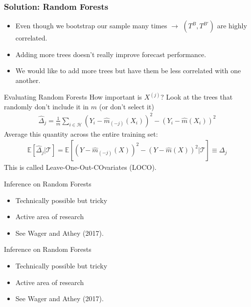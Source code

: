 \documentclass[xcolor=pdftex,dvipsnames,table,mathserif]{beamer}
\begin{document}
\begin{frame}
\frametitle{Solution: Random Forests}
\begin{itemize}
\item Even though we bootstrap our sample many times $\rightarrow$ $(T^B,T^{B'})$ are highly correlated.
\item Adding more trees doesn't really improve forecast performance.
\item We would like to add more trees but have them be \alert{less correlated} with one another.
\end{itemize}
\end{frame}

\begin{frame}{Evaluating Random Forests}
How important is $X^{(j)}$? Look at the trees that randomly don't include it in $m$ (or don't select it)
\begin{align*}
\widehat{\Delta}_{j}=\frac{1}{m} \sum_{i \in \mathcal{H}} \left(Y_{i}-\widehat{m}_{(-j)}\left(X_{i}\right)\right)^{2}-\left(Y_{i}-\widehat{m}\left(X_{i}\right)\right)^{2}
\end{align*}
Average this quantity across the entire training set:
\begin{align*}
\mathbb{E}\left[\widehat{\Delta}_{j} | \mathcal{T}\right]=\mathbb{E}\left[\left(Y-\widehat{m}_{(-j)}(X)\right)^{2}-(Y-\widehat{m}(X))^{2} | \mathcal{T}\right] \equiv \Delta_{j}
\end{align*}
This is called \alert{Leave-One-Out-COvariates} (LOCO).
\end{frame}


\begin{frame}{Inference on Random Forests}
\begin{itemize}
\item Technically possible but tricky
\item Active area of research
\item See Wager and Athey (2017).
\end{itemize}
\end{frame}


\begin{frame}{Inference on Random Forests}
\begin{itemize}
\item Technically possible but tricky
\item Active area of research
\item See Wager and Athey (2017).
\end{itemize}
\end{frame}
\end{document}
